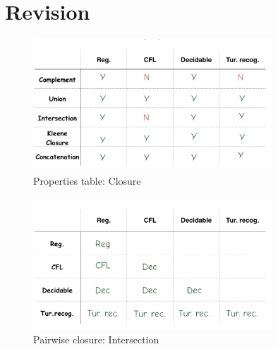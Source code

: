 \documentclass[a4paper]{article}
\theoremstyle{plain}
\theoremstyle{definition}
\theoremstyle{remark}
\begin{document}
\section{Revision}
\begin{figure}[H]
	\centering
	\includegraphics[width=0.8\textwidth]{table.png}
	\caption{Properties table: Closure}
	\label{fig:table-png}
\end{figure}
\begin{figure}[H]
	\centering
	\includegraphics[width=0.8\textwidth]{pair.png}
	\caption{Pairwise closure: Intersection}
	\label{fig:pair-png}
\end{figure}
\end{document}
